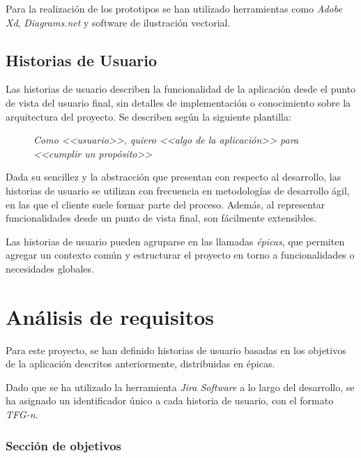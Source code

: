 \documentclass[10pt, a4paper]{aqademic}
\begin{document}
Para la realización de los prototipos se han utilizado herramientas como \textit{Adobe Xd}, \textit{Diagrams.net} y software de ilustración vectorial.


\subsection*{Historias de Usuario}

Las historias de usuario describen la funcionalidad de la aplicación desde el punto de vista del usuario final, sin detalles de implementación o conocimiento sobre la arquitectura del proyecto. Se describen según la siguiente plantilla:

\medskip

\begin{figure}[h]
	\centering
	\textit{Como <<usuario>>, quiero <<algo de la aplicación>> para <<cumplir un propósito>>}
\end{figure}

Dada su sencillez y la abstracción que presentan con respecto al desarrollo, las historias de usuario se utilizan con frecuencia en metodologías de desarrollo ágil, en las que el cliente suele formar parte del proceso. Además, al representar funcionalidades desde un punto de vista final, son fácilmente extensibles.

Las historias de usuario pueden agruparse en las llamadas \textit{épicas}, que permiten agregar un contexto común y estructurar el proyecto en torno a funcionalidades o necesidades globales.


\section{Análisis de requisitos}

Para este proyecto, se han definido historias de usuario basadas en los objetivos de la aplicación descritos anteriormente, distribuidas en épicas.

Dado que se ha utilizado la herramienta \textit{Jira Software} a lo largo del desarrollo, se ha asignado un identificador único a cada historia de usuario, con el formato \textit{TFG-n}.

\subsubsection*{Sección de objetivos}
\end{document}
